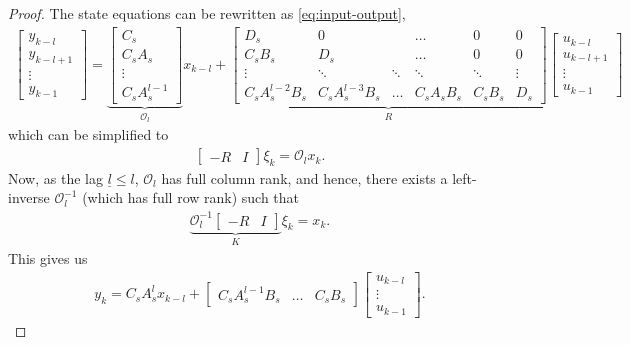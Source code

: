 \begin{proof}
The state equations can be rewritten as \eqref{eq:input-output},
\begin{align}
\begin{bmatrix} y_{k-l} \\ y_{k-l+1} \\ \vdots \\ y_{k-1} \end{bmatrix} = \underbrace{\begin{bmatrix} C_s \\ C_sA_s \\ \vdots \\ C_sA_s^{l-1} \end{bmatrix}}_{\mathcal{O}_l} x_{k-l} + 
\underbrace{\begin{bmatrix} 
D_s & 0 & & \dots & 0 & 0 \\
C_sB_s & D _s& & \dots & 0 & 0 \\
\vdots & \ddots & \ddots&\ddots&\ddots&\vdots \\
C_sA_s^{l-2}B_s & C_sA_s^{l-3}B_s &\dots & C_sA_sB_s & C_sB_s &D_s
\end{bmatrix} }_R
\begin{bmatrix} u_{k-l} \\ u_{k-l+1} \\ \vdots \\ u_{k-1} \end{bmatrix}
\label{eq:input-output}
\end{align}
which can be simplified to
%
\begin{align*}
\begin{bmatrix} 
-R & I
\end{bmatrix} \xi_k = \mathcal{O}_l x_k.
\end{align*}
Now, as the lag $\underline{l}\leq l$, $\mathcal{O}_l$ has full column rank, and hence, there exists a left-inverse $\mathcal{O}_l^{-1}$ (which has full row rank) such that
\begin{align*}
\underbrace{\mathcal{O}_l^{-1} \begin{bmatrix} 
-R & I
\end{bmatrix}}_{K} \xi_k = x_k.
\end{align*}
This gives us
\begin{align*}
y_{k} = C_s A_s^l x_{k-l} + \begin{bmatrix} C_sA_s^{l-1} B_s & \dots & C_sB_s \end{bmatrix} \begin{bmatrix} u_{k-l} \\ \vdots \\ u_{k-1} \end{bmatrix}.

\end{align*}
\end{proof}
